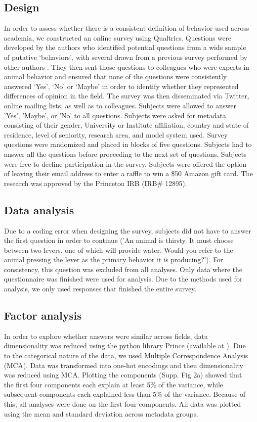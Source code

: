 \documentclass[a4paper, 11pt]{article}
\begin{document}
\subsection*{Design}
In order to assess whether there is a consistent definition of behavior used across academia, we constructed an online survey using Qualtrics. Questions were developed by the authors who identified potential questions from a wide sample of putative `behaviors', with several drawn from a previous survey performed by other authors \cite{levitis2009behavioural}. They then sent those questions to colleagues who were experts in animal behavior and ensured that none of the questions were consistently answered `Yes', `No' or `Maybe' in order to identify whether they represented differences of opinion in the field. The survey was then disseminated via Twitter, online mailing lists, as well as to colleagues. Subjects were allowed to answer 'Yes', 'Maybe', or 'No' to all questions. Subjects were asked for metadata consisting of their gender, University or Institute affiliation, country and state of residence, level of seniority, research area, and model system used. Survey questions were randomized and placed in blocks of five questions. Subjects had to answer all the questions before proceeding to the next set of questions. Subjects were free to decline participation in the survey. Subjects were offered the option of leaving their email address to enter a raffle to win a \$50 Amazon gift card. The research was approved by the Princeton IRB (IRB\# 12895).

\subsection*{Data analysis}
Due to a coding error when designing the survey, subjects did not have to answer the first question in order to continue ('An animal is thirsty. It must choose between two levers, one of which will provide water. Would you refer to the animal pressing the lever as the primary behavior it is producing?'). For consistency, this question was excluded from all analyses. Only data where the questionnaire was finished were used for analysis. Due to the methods used for analysis, we only used responses that finished the entire survey.

\subsection*{Factor analysis}
In order to explore whether answers were similar across fields, data dimensionality was reduced using the python library Prince (available at \href{https://github.com/MaxHalford/prince}). Due to the categorical nature of the data, we used Multiple Correspondence Analysis (MCA). Data was transformed into one-hot encodings and then dimensionality was reduced using MCA. Plotting the components (Supp. Fig 2a) showed that the first four components each explain at least 5\% of the variance, while subsequent components each explained less than 5\% of the variance. Because of this, all analyses were done on the first four components. All data was plotted using the mean and standard deviation across metadata groups.
\end{document}
